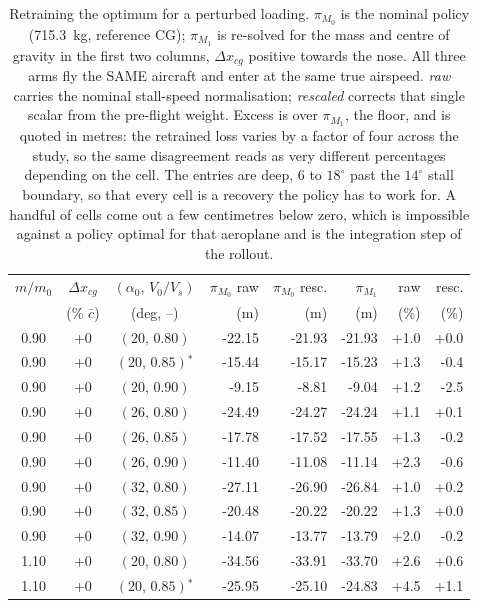 \begin{table}[H]
\caption{Retraining the optimum for a perturbed loading. $\pi_{M_0}$
is the nominal policy (715.3~kg, reference CG); $\pi_{M_1}$ is
re-solved for the mass and centre of gravity in the first two
columns, $\Delta x_{cg}$ positive towards the nose. All three arms
fly the SAME aircraft and enter
at the same true airspeed. \emph{raw} carries the nominal stall-speed
normalisation; \emph{rescaled} corrects that single scalar from the
pre-flight weight. Excess is over $\pi_{M_1}$, the floor, and is
quoted in metres: the retrained loss varies by a factor of four
across the study, so the same disagreement reads as very different
percentages depending on the cell. The entries are deep, $6$ to
$18^\circ$ past the $14^\circ$ stall boundary, so that every cell
is a recovery the policy has to work for. A handful of cells come
out a few centimetres below zero, which is impossible against a
policy optimal for that aeroplane and is the integration step of
the rollout.}
\label{tab:retrain_mass}
\centering
\begin{tabular}{cccrrrrr}
\hline
$m/m_0$ & $\Delta x_{cg}$ & $(\alpha_0,\,V_0/V_s)$ & $\pi_{M_0}$ raw & $\pi_{M_0}$ resc. & $\pi_{M_1}$ & raw & resc. \\
 & (\% $\bar{c}$) & (deg, --) & (m) & (m) & (m) & (\%) & (\%) \\
\hline
0.90 & +0 & $(20,\,0.80)$ & -22.15 & -21.93 & -21.93 & +1.0 & +0.0 \\
0.90 & +0 & $(20,\,0.85)$$^\ast$ & -15.44 & -15.17 & -15.23 & +1.3 & -0.4 \\
0.90 & +0 & $(20,\,0.90)$ & -9.15 & -8.81 & -9.04 & +1.2 & -2.5 \\
0.90 & +0 & $(26,\,0.80)$ & -24.49 & -24.27 & -24.24 & +1.1 & +0.1 \\
0.90 & +0 & $(26,\,0.85)$ & -17.78 & -17.52 & -17.55 & +1.3 & -0.2 \\
0.90 & +0 & $(26,\,0.90)$ & -11.40 & -11.08 & -11.14 & +2.3 & -0.6 \\
0.90 & +0 & $(32,\,0.80)$ & -27.11 & -26.90 & -26.84 & +1.0 & +0.2 \\
0.90 & +0 & $(32,\,0.85)$ & -20.48 & -20.22 & -20.22 & +1.3 & +0.0 \\
0.90 & +0 & $(32,\,0.90)$ & -14.07 & -13.77 & -13.79 & +2.0 & -0.2 \\
\hline
1.10 & +0 & $(20,\,0.80)$ & -34.56 & -33.91 & -33.70 & +2.6 & +0.6 \\
1.10 & +0 & $(20,\,0.85)$$^\ast$ & -25.95 & -25.10 & -24.83 & +4.5 & +1.1 \\

\end{tabular}
\end{table}
